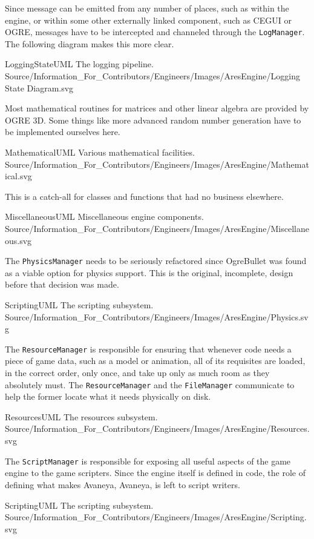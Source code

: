 Since message can be emitted from any number of places, such as within the engine, or within some other externally linked component, such as CEGUI or OGRE, messages have to be intercepted and channeled through the {\tt LogManager}. The following diagram makes this more clear.

\FullPageLandscapeDiagram
    {LoggingStateUML}
    {The logging pipeline.}
    {Source/Information_For_Contributors/Engineers/Images/AresEngine/Logging State Diagram.svg}

\page 
{}
Most mathematical routines for matrices and other linear algebra are provided by OGRE 3D. Some things like more advanced random number generation have to be implemented ourselves here.

\FullPageLandscapeDiagram
    {MathematicalUML}
    {Various mathematical facilities.}
    {Source/Information_For_Contributors/Engineers/Images/AresEngine/Mathematical.svg}

\page 
{}
This is a catch-all for classes and functions that had no business elsewhere.

\FullPageLandscapeDiagram
    {MiscellaneousUML}
    {Miscellaneous engine components.}
    {Source/Information_For_Contributors/Engineers/Images/AresEngine/Miscellaneous.svg}

\page 
{}
The {\tt PhysicsManager} needs to be seriously refactored since OgreBullet was found as a viable option for physics support. This is the original, incomplete, design before that decision was made.

\FullPageLandscapeDiagram
    {ScriptingUML}
    {The scripting subsystem.}
    {Source/Information_For_Contributors/Engineers/Images/AresEngine/Physics.svg}

\page 
{}
The {\tt ResourceManager} is responsible for ensuring that whenever code needs a piece of game data, such as a model or animation, all of its requisites are loaded, in the correct order, only once, and take up only as much room as they absolutely must. The {\tt ResourceManager} and the {\tt FileManager} communicate to help the former locate what it needs physically on disk.

\FullPageLandscapeDiagram
    {ResourcesUML}
    {The resources subsystem.}
    {Source/Information_For_Contributors/Engineers/Images/AresEngine/Resources.svg}

\page 
{}
The {\tt ScriptManager} is responsible for exposing all useful aspects of the game engine to the game scripters. Since the engine itself is defined in code, the role of defining what makes Avaneya, Avaneya, is left to script writers.

\FullPageLandscapeDiagram
    {ScriptingUML}
    {The scripting subsystem.}
    {Source/Information_For_Contributors/Engineers/Images/AresEngine/Scripting.svg}

